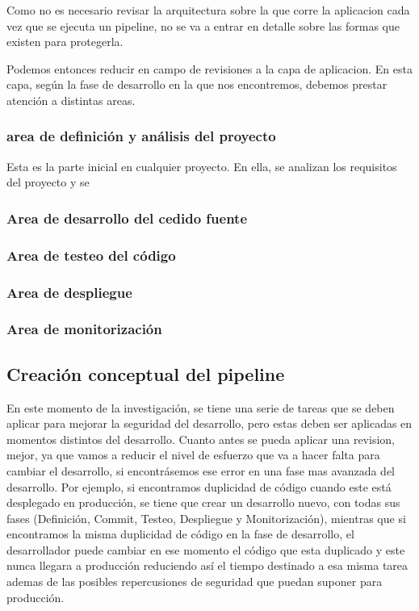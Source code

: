 \documentclass[12pt]{report} %
\begin{document}
Como no es necesario revisar la arquitectura sobre la que corre la
aplicacion cada vez que se ejecuta un \Gls{pipeline}, no se va a entrar en 
detalle sobre las formas que existen para protegerla.

Podemos entonces reducir en campo de revisiones a la capa de aplicacion.
En esta capa, según la fase de desarrollo en la que nos encontremos, debemos
prestar atención a distintas areas.

\subsubsection{area de definición y análisis del proyecto}

Esta es la parte inicial en cualquier proyecto.
En ella, se analizan los requisitos del proyecto y se

\subsubsection{Area de desarrollo del cedido fuente}
\subsubsection{Area de testeo del código}
\subsubsection{Area de despliegue}
\subsubsection{Area de monitorización}

\subsection{Creación conceptual del pipeline}

En este momento de la investigación, se tiene una serie de tareas que se deben
aplicar para mejorar la seguridad del desarrollo, pero estas deben ser aplicadas
en momentos distintos del desarrollo. 
Cuanto antes se pueda aplicar una revision, mejor, ya que vamos a reducir el
nivel de esfuerzo que va a hacer falta para cambiar el desarrollo, si
encontrásemos ese error en una fase mas avanzada del desarrollo.
Por ejemplo, si encontramos duplicidad de código cuando este está
desplegado en producción, se tiene que crear un desarrollo nuevo, con todas sus
fases (Definición, Commit, Testeo, Despliegue y Monitorización), mientras que si
encontramos la misma duplicidad de código en la fase de desarrollo, el
desarrollador puede cambiar en ese momento el código que esta duplicado y este
nunca llegara a producción reduciendo así el tiempo destinado a esa misma tarea
ademas de las posibles repercusiones de seguridad que puedan suponer para
producción. 
\end{document}
